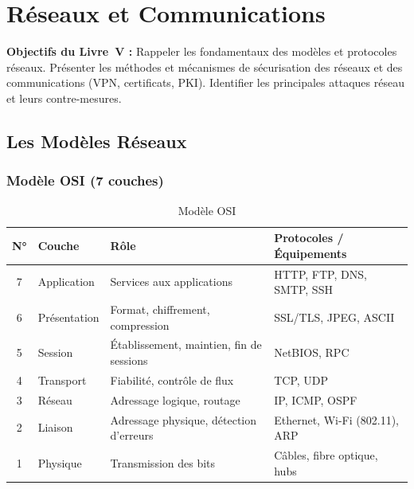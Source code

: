 
\chapter{Réseaux et Communications}
\label{chap:reseaux}

\begin{boxobjectifs}
\textbf{Objectifs du Livre~V :} Rappeler les fondamentaux des modèles et protocoles réseaux. Présenter les méthodes et mécanismes de sécurisation des réseaux et des communications (VPN, certificats, PKI). Identifier les principales attaques réseau et leurs contre-mesures.
\end{boxobjectifs}

\section{Les Modèles Réseaux}

\subsection{Modèle OSI (7 couches)}

\begin{table}[H]
\centering
\small
\begin{tabular}{clp{4cm}p{4cm}}
    \toprule
    \textbf{N°} & \textbf{Couche} & \textbf{Rôle} & \textbf{Protocoles / Équipements} \\
    \midrule
    7 & Application    & Services aux applications & HTTP, FTP, DNS, SMTP, SSH \\
    6 & Présentation   & Format, chiffrement, compression & SSL/TLS, JPEG, ASCII \\
    5 & Session        & Établissement, maintien, fin de sessions & NetBIOS, RPC \\
    4 & Transport      & Fiabilité, contrôle de flux & TCP, UDP \\
    3 & Réseau         & Adressage logique, routage & IP, ICMP, OSPF \\
    2 & Liaison        & Adressage physique, détection d'erreurs & Ethernet, Wi-Fi (802.11), ARP \\
    1 & Physique       & Transmission des bits & Câbles, fibre optique, hubs \\
    \bottomrule
\end{tabular}
\caption{Modèle OSI}
\end{table}

